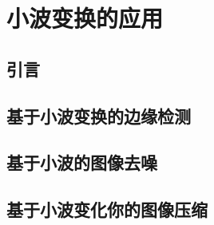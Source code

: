 \chapter{小波变换的应用}\label{chap:introduction}

\section{引言}

\section{基于小波变换的边缘检测}

\section{基于小波的图像去噪}

\section{基于小波变化你的图像压缩}

